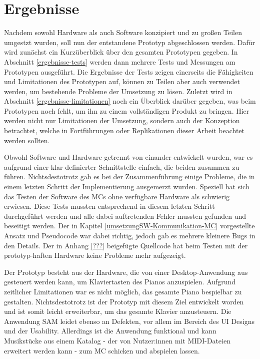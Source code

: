 

\chapter{Ergebnisse} \label{ergebnisse}

Nachdem sowohl Hardware als auch Software konzipiert und zu großen Teilen umgestzt wurden, soll nun der entstandene Prototyp abgeschlossen werden.
Dafür wird zunächst ein Kurzüberblick über den gesamten Prototypen gegeben.
In Abschnitt \ref{ergebnisse-tests} werden dann mehrere Tests und Messungen am Prototypen ausgeführt.
Die Ergebnisse der Tests zeigen einerseits die Fähigkeiten und Limitationen des Prototypen auf, können zu Teilen aber auch verwendet werden, um bestehende Probleme der Umsetzung zu lösen.
Zuletzt wird in Abschnitt \ref{ergebnisse-limitationen} noch ein Überblick darüber gegeben, was beim Prototypen noch fehlt, um ihn zu einem vollständigen Produkt zu bringen. %
Hier werden nicht nur Limitationen der Umsetzung, sondern auch der Konzeption betrachtet, welche in Fortführungen oder Replikationen dieser Arbeit beachtet werden sollten.


Obwohl Software und Hardware getrennt von einander entwickelt wurden, war es aufgrund einer klar definierter Schnittstelle einfach, die beiden zusammen zu führen.
Nichtsdestotrotz gab es bei der Zusammenführung einige Probleme, die in einem letzten Schritt der Implementierung ausgemerzt wurden.
Speziell hat sich das Testen der Software des \ac{MC}s ohne verfügbare Hardware als schwierig erwiesen.
Diese Tests mussten entsprechend in diesem letzten Schritt durchgeführt werden und alle dabei auftretenden Fehler mussten gefunden und beseitigt werden.
Der in Kapitel \ref{umsetzungSW-Kommunikation-MC} vorgestellte Ansatz und Pseudocode war dabei richtig, jedoch gab es mehrere kleinere Bugs in den Details.
Der in Anhang \ref{???} beigefügte Quellcode hat beim Testen mit der prototyp-haften Hardware keine Probleme mehr aufgezeigt.

Der Prototyp besteht aus der Hardware, die von einer Desktop-Anwendung aus gesteuert werden kann, um Klaviertasten des Pianos anzuspielen.
Aufgrund zeitlicher Limitationen war es nicht möglich, das gesamte Piano bespielbar zu gestalten.
Nichtsdestotrotz ist der Prototyp mit diesem Ziel entwickelt worden und ist somit leicht erweiterbar, um das gesamte Klavier anzusteuern.
Die Anwendung \ac{SAM} leidet ebenso an Defekten, vor allem im Bereich des \ac{UI} Designs und der Usability.
Allerdings ist die Anwendung funktional und kann Musikstücke aus einem Katalog - der von Nutzer:innen mit \ac{MIDI}-Dateien erweitert werden kann - zum \ac{MC} schicken und abspielen lassen.




